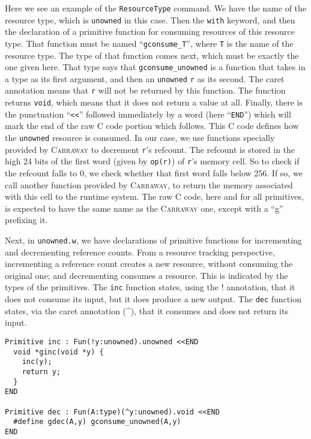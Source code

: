 \documentclass{book}[12pt]
\newcommand{\carraway}[0]{\textsc{Carraway}\xspace}
\begin{document}
\noindent Here we see an example of the \texttt{ResourceType} command.
We have the name of the resource type, which is \texttt{unowned} in
this case.  Then the \texttt{with} keyword, and then the declaration
of a primitive function for consuming resources of this resource type.
That function must be named ``\texttt{gconsume\_T}'', where \texttt{T}
is the name of the resource type.  The type of that function comes
next, which must be exactly the one given here.  That type says that
\texttt{gconsume\_unowned} is a function that takes in a type as its
first argument, and then an \texttt{unowned} \texttt{r} as its second.
The caret annotation means that \texttt{r} will not be returned by
this function.  The function returns \texttt{void}, which means that
it does not return a value at all.  Finally, there is the punctuation
``\texttt{<<}'' followed immediately by a word (here ``\texttt{END}'')
which will mark the end of the raw C code portion which follows.  This
C code defines how the \texttt{unowned} resource is consumed.  In our
case, we use functions specially provided by \carraway to decrement
\texttt{r}'s refcount.  The refcount is stored in the high 24 bits of
the first word (given by \texttt{op(r)}) of \texttt{r}'s memory cell.
So to check if the refcount falls to $0$, we check whether that first
word falls below 256.  If so, we call another function provided by
\carraway, to return the memory associated with this cell to the
runtime system.  The raw C code, here and for all primitives, is
expected to have the same name as the \carraway one, except with a
``g'' prefixing it.

Next, in \texttt{unowned.w}, we have declarations of primitive
functions for incrementing and decrementing reference counts.  From a
resource tracking perspective, incrementing a reference count creates
a new resource, without consuming the original one; and decrementing
consumes a resource.  This is indicated by the types of the primitives.
The \texttt{inc} function states, using the ! annotation, that it does
not consume its input, but it does produce a new output.  The \texttt{dec}
function states, via the caret annotation (\^{}), that it consumes and
does not return its input.

\begin{verbatim}
Primitive inc : Fun(!y:unowned).unowned <<END
  void *ginc(void *y) {
    inc(y);
    return y;
  }
END

Primitive dec : Fun(A:type)(^y:unowned).void <<END
  #define gdec(A,y) gconsume_unowned(A,y)
END
\end{verbatim}
\end{document}
